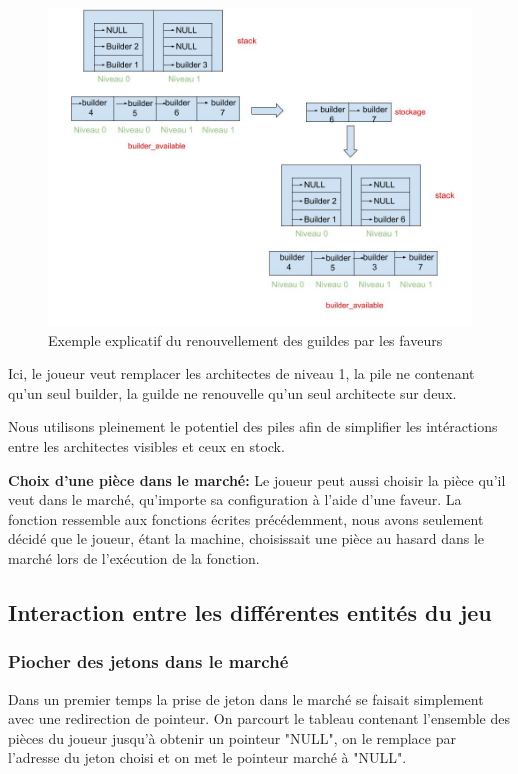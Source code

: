 \documentclass{article}
\begin{document}
             
        \begin{figure}[!ht]
            \centering
            \includegraphics[width=0.8\linewidth]{favor_guild_renew.jpg}
            \caption{Exemple explicatif du renouvellement des guildes par les faveurs}
            \label{favor_guild_renew}
        \end{figure}

        \vspace{1cm}


        Ici, le joueur veut remplacer les architectes de niveau 1, la pile ne contenant qu'un seul builder, la guilde ne renouvelle qu'un seul architecte sur deux.

        Nous utilisons pleinement le potentiel des piles afin de simplifier les intéractions entre les architectes visibles et ceux en stock.

        \textbf{Choix d'une pièce dans le marché:} Le joueur peut aussi choisir la pièce qu'il veut dans le marché, qu'importe sa configuration à l'aide d'une faveur. La fonction ressemble aux fonctions écrites précédemment, nous avons seulement décidé que le joueur, étant la machine, choisissait une pièce au hasard dans le marché lors de l'exécution de la fonction.

    
    \subsection{Interaction entre les différentes entités du jeu}

    \subsubsection{Piocher des jetons dans le marché} Dans un premier temps la prise de jeton dans le marché se faisait simplement avec une redirection de pointeur. On parcourt le tableau contenant l'ensemble des pièces du joueur jusqu'à obtenir un pointeur "NULL", on le remplace par l'adresse du jeton choisi et on met le pointeur marché à "NULL".
\end{document}
